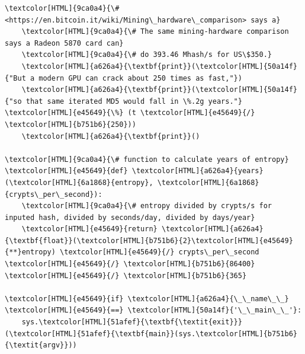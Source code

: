 \documentclass{scrartcl}
\begin{document}
\begin{Code}
\begin{Verbatim}[]
    \textcolor[HTML]{9ca0a4}{\# <https://en.bitcoin.it/wiki/Mining\_hardware\_comparison> says a}
    \textcolor[HTML]{9ca0a4}{\# The same mining-hardware comparison says a Radeon 5870 card can}
    \textcolor[HTML]{9ca0a4}{\# do 393.46 Mhash/s for US\$350.}
    \textcolor[HTML]{a626a4}{\textbf{print}}(\textcolor[HTML]{50a14f}{"But a modern GPU can crack about 250 times as fast,"})
    \textcolor[HTML]{a626a4}{\textbf{print}}(\textcolor[HTML]{50a14f}{"so that same iterated MD5 would fall in \%.2g years."} \textcolor[HTML]{e45649}{\%} (t \textcolor[HTML]{e45649}{/} \textcolor[HTML]{b751b6}{250}))
    \textcolor[HTML]{a626a4}{\textbf{print}}()

\textcolor[HTML]{9ca0a4}{\# function to calculate years of entropy}
\textcolor[HTML]{e45649}{def} \textcolor[HTML]{a626a4}{years}(\textcolor[HTML]{6a1868}{entropy}, \textcolor[HTML]{6a1868}{crypts\_per\_second}):
    \textcolor[HTML]{9ca0a4}{\# entropy divided by crypts/s for inputed hash, divided by seconds/day, divided by days/year}
    \textcolor[HTML]{e45649}{return} \textcolor[HTML]{a626a4}{\textbf{float}}(\textcolor[HTML]{b751b6}{2}\textcolor[HTML]{e45649}{**}entropy) \textcolor[HTML]{e45649}{/} crypts\_per\_second \textcolor[HTML]{e45649}{/} \textcolor[HTML]{b751b6}{86400} \textcolor[HTML]{e45649}{/} \textcolor[HTML]{b751b6}{365}

\textcolor[HTML]{e45649}{if} \textcolor[HTML]{a626a4}{\_\_name\_\_} \textcolor[HTML]{e45649}{==} \textcolor[HTML]{50a14f}{'\_\_main\_\_'}:
    sys.\textcolor[HTML]{51afef}{\textbf{\textit{exit}}}(\textcolor[HTML]{51afef}{\textbf{main}}(sys.\textcolor[HTML]{b751b6}{\textit{argv}}))

\end{Verbatim}
\end{Code}
\end{document}
